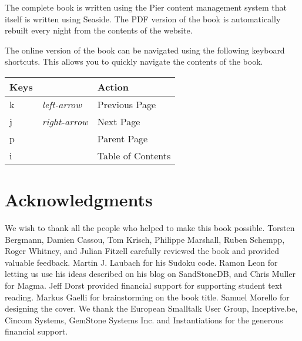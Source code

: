 \documentclass[a4paper,10pt,twoside]{book}
\newcommand{\ct}[1]{{\small\ttfamily\textup{#1}}}
\begin{document}
The complete book is written using the Pier content management system that itself is written using Seaside. The PDF version of the book is automatically rebuilt every night from the contents of the website.

The online version of the book can be navigated using the following keyboard shortcuts. This allows you to quickly navigate the contents of the book.

\begin{tabularx}{\textwidth}{lll}
\textbf{Keys }&\textbf{                }&\textbf{Action }\\ \hline
 \ct{k} & \textit{left-arrow}   & Previous Page\\
 \ct{j} & \textit{right-arrow}  & Next Page\\
 \ct{p} &                  & Parent Page\\
 \ct{i} &                  & Table of Contents\\
\end{tabularx}



\section{Acknowledgments}
\label{book:introduction:acknowledgments}

We wish to thank all the people who helped to make this book possible. Torsten Bergmann, Damien Cassou, Tom Krisch, Philippe Marshall, Ruben Schempp, Roger Whitney, and Julian Fitzell carefully reviewed the book and provided valuable feedback. Martin J. Laubach for his Sudoku code. Ramon Leon for letting us use his ideas described on his blog on SandStoneDB, and Chris Muller for Magma. Jeff Dorst provided financial support for supporting student text reading. Markus Gaelli for brainstorming on the book title. Samuel Morello for designing the cover. We thank the European Smalltalk User Group, Inceptive.be, Cincom Systems, GemStone Systems Inc. and Instantiations for the generous financial support.
\end{document}
